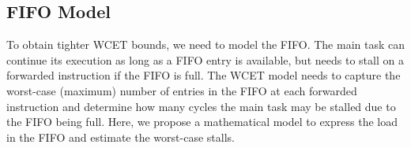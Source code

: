 \subsection{FIFO Model}
\label{sec:monitoring_wcet.wcet.model}

To obtain tighter WCET bounds, we need to model the FIFO.  The main task can
continue its execution as long as a FIFO entry is available, but needs to stall
on a forwarded instruction if the FIFO is full. The WCET model needs to capture
the worst-case (maximum) number of entries in the FIFO at each forwarded
instruction and determine how many cycles the main task may be stalled due to
the FIFO being full. Here, we propose a mathematical model to express the load
in the FIFO and estimate the worst-case stalls.

\begin{figure} 
  \begin{center} 

\end{center}
\end{figure}

